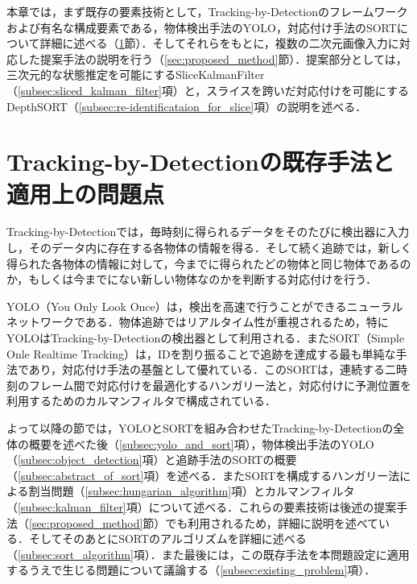\thispagestyle{fancy2}

本章では，まず既存の要素技術として，Tracking-by-Detectionのフレームワークおよび有名な構成要素である，物体検出手法のYOLO，対応付け手法のSORTについて詳細に述べる（\ref{sec:existing_method}節）．そしてそれらをもとに，複数の二次元画像入力に対応した提案手法の説明を行う（\ref{sec:proposed_method}節）．提案部分としては，三次元的な状態推定を可能にするSliceKalmanFilter（\ref{subsec:sliced_kalman_filter}項）と，スライスを跨いだ対応付けを可能にするDepthSORT（\ref{subsec:re-identificataion_for_slice}項）の説明を述べる．

\section{Tracking-by-Detectionの既存手法と適用上の問題点}
\label{sec:existing_method}

Tracking-by-Detectionでは，毎時刻に得られるデータをそのたびに検出器に入力し，そのデータ内に存在する各物体の情報を得る．そして続く追跡では，新しく得られた各物体の情報に対して，今までに得られたどの物体と同じ物体であるのか，もしくは今までにない新しい物体なのかを判断する対応付けを行う．

YOLO（You Only Look Once）\cite{redmon2016you, alif2024yolov1}は，検出を高速で行うことができるニューラルネットワークである．物体追跡ではリアルタイム性が重視されるため，特にYOLOはTracking-by-Detectionの検出器として利用される．またSORT（Simple Onle Realtime Tracking）\cite{bewley2016simple,wojke2017simple,du2023strongsort}は，IDを割り振ることで追跡を達成する最も単純な手法であり，対応付け手法の基盤として優れている．このSORTは，連続する二時刻のフレーム間で対応付けを最適化するハンガリー法\cite{kuhn1955hungarian}と，対応付けに予測位置を利用するためのカルマンフィルタ\cite{bishop2001introduction}で構成されている．

よって以降の節では，YOLOとSORTを組み合わせたTracking-by-Detectionの全体の概要を述べた後（\ref{subsec:yolo_and_sort}項），物体検出手法のYOLO（\ref{subsec:object_detection}項）と追跡手法のSORTの概要（\ref{subsec:abstract_of_sort}項）を述べる．またSORTを構成するハンガリー法による割当問題（\ref{subsec:hungarian_algorithm}項）とカルマンフィルタ（\ref{subsec:kalman_filter}項）について述べる．これらの要素技術は後述の提案手法（\ref{sec:proposed_method}節）でも利用されるため，詳細に説明を述べている．そしてそのあとにSORTのアルゴリズムを詳細に述べる（\ref{subsec:sort_algorithm}項）．また最後には，この既存手法を本問題設定に適用するうえで生じる問題について議論する（\ref{subsec:existing_problem}項）．

